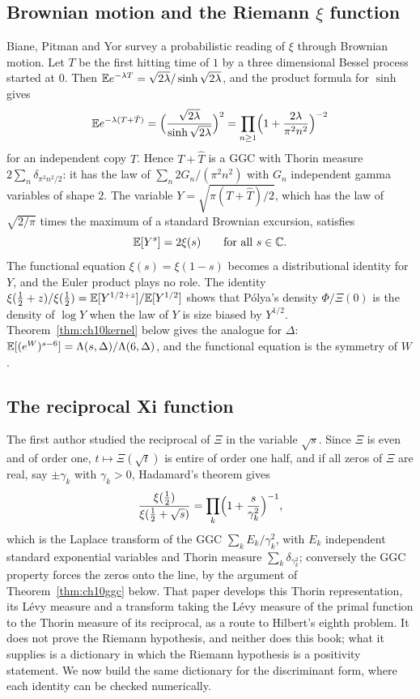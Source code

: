 \subsection{Brownian motion and the Riemann $\xi$ function}\label{sec:ch10bpy}

Biane, Pitman and Yor \cite{bpy2001} survey a probabilistic reading of $\xi$ through Brownian motion. Let $T$ be the first hitting time of $1$ by a three dimensional Bessel process started at $0$. Then $\mathbb{E} e^{-\lambda T} = \sqrt{2\lambda}/\sinh\sqrt{2\lambda}$, and the product formula for $\sinh$ gives
\[
\mathbb{E} e^{-\lambda(T+\hat T)} = \Bigl(\frac{\sqrt{2\lambda}}{\sinh\sqrt{2\lambda}}\Bigr)^2 = \prod_{n\ge1}\Bigl(1+\frac{2\lambda}{\pi^2n^2}\Bigr)^{-2}
\]
for an independent copy $\hat T$. Hence $T+\hat T$ is a GGC with Thorin measure $2\sum_n\delta_{\pi^2n^2/2}$: it has the law of $\sum_n 2G_n/(\pi^2n^2)$ with $G_n$ independent gamma variables of shape $2$. The variable $Y = \sqrt{\pi(T+\hat T)/2}$, which has the law of $\sqrt{2/\pi}$ times the maximum of a standard Brownian excursion, satisfies
\[
\mathbb{E}[Y^s] = 2\xi(s)\qquad\text{for all } s\in\mathbb{C} .
\]
The functional equation $\xi(s)=\xi(1-s)$ becomes a distributional identity for $Y$, and the Euler product plays no role. The identity $\xi(\frac12+z)/\xi(\frac12) = \mathbb{E}[Y^{1/2+z}]/\mathbb{E}[Y^{1/2}]$ shows that P\'olya's density $\Phi/\Xi(0)$ is the density of $\log Y$ when the law of $Y$ is size biased by $Y^{1/2}$. Theorem~\ref{thm:ch10kernel} below gives the analogue for $\Delta$: $\mathbb{E}[(e^W)^{s-6}] = \Lambda(s,\Delta)/\Lambda(6,\Delta)$, and the functional equation is the symmetry of $W$.

\subsection{The reciprocal Xi function}

The first author \cite{polson2017} studied the reciprocal of $\Xi$ in the variable $\sqrt s$. Since $\Xi$ is even and of order one, $t\mapsto\Xi(\sqrt t)$ is entire of order one half, and if all zeros of $\Xi$ are real, say $\pm\gamma_k$ with $\gamma_k>0$, Hadamard's theorem gives
\[
\frac{\xi(\frac12)}{\xi(\frac12+\sqrt s)} = \prod_k\Bigl(1+\frac{s}{\gamma_k^2}\Bigr)^{-1},
\]
which is the Laplace transform of the GGC $\sum_kE_k/\gamma_k^2$, with $E_k$ independent standard exponential variables and Thorin measure $\sum_k\delta_{\gamma_k^2}$; conversely the GGC property forces the zeros onto the line, by the argument of Theorem~\ref{thm:ch10ggc} below. That paper develops this Thorin representation, its L\'evy measure and a transform taking the L\'evy measure of the primal function to the Thorin measure of its reciprocal, as a route to Hilbert's eighth problem. It does not prove the Riemann hypothesis, and neither does this book; what it supplies is a dictionary in which the Riemann hypothesis is a positivity statement. We now build the same dictionary for the discriminant form, where each identity can be checked numerically.

